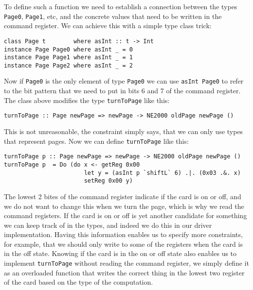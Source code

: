\documentclass{article}
\begin{document}
To define such a function we need to establish a connection between the
types \verb#Page0#, \verb#Page1#, etc, and the concrete values that need to be written in the
command register.  We can achieve this with a simple type class trick:
\begin{verbatim}
class Page t        where asInt :: t -> Int
instance Page Page0 where asInt _ = 0
instance Page Page1 where asInt _ = 1
instance Page Page2 where asInt _ = 2
\end{verbatim}
Now if \verb#Page0# is the only element of type \verb#Page0# we can use
\verb#asInt Page0# to refer to the bit pattern that we need to put in
bits 6 and 7 of the command register.  
The class above modifies the type \verb#turnToPage# like this:
\begin{verbatim}
turnToPage :: Page newPage => newPage -> NE2000 oldPage newPage ()
\end{verbatim}
This is not unreasonable, the constraint simply says, that we can only 
use types that represent pages.  Now we can define \verb#turnToPage# like this:
\begin{verbatim}
turnToPage p :: Page newPage => newPage -> NE2000 oldPage newPage ()
turnToPage p  = Do (do x <- getReg 0x00
                       let y = (asInt p `shiftL` 6) .|. (0x03 .&. x)
                       setReg 0x00 y)
\end{verbatim}
The lowest 2 bites of the command register indicate if the card is on or off,
and we do not want to change this when we turn the page, 
which is why we read the command registers.  If the card is on or off is 
yet another candidate for something we can keep track of in the types, 
and indeed we do this in our driver implementation.  Having this information 
enables us to specify more constraints, for example, that we should only 
write to some of the registers when the card is in the off state.
Knowing if the card is in the on or off state also enables us to implement
\verb#turnToPage# without reading the command register, we simply define
it as an overloaded function that writes the correct thing in the 
lowest two register of the card based on the type of the computation.



\end{document}
